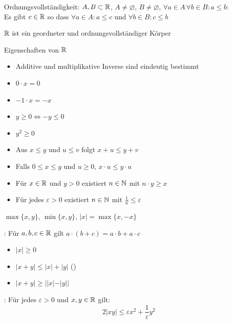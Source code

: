 \Satz Ordnungsvollständigkeit: $A, B \subset \mathbb{R}$, $A\ne \varnothing$, $B\ne \varnothing$,
$\forall a \in A \, \forall b \in B : a\le b$: \\
Es gibt $c \in \mathbb{R}$ so dass $\forall a \in A : a\le c$ und $\forall b \in B : c\le b$

\Satz $\mathbb{R}$ ist ein geordneter und ordnungsvollständiger Körper

\Kor Eigenschaften von $\mathbb{R}$
\vspace{-0.6em}
\begin{itemize}
    \item Additive und multiplikative Inverse sind eindeutig bestimmt
    \item $0 \cdot x = 0$
    \item $-1 \cdot x = -x$
    \item $y\ge 0 \iff -y\le 0$
    \item $y^2\ge 0$
    \item Aus $x\le y$ und $u\le v$ folgt $x + u\le y + v$
    \item Falls $0\le x\le y$ und $u\ge 0$, $x \cdot u\le y \cdot u$
\end{itemize}

\Kor {}
\vspace{-0.6em}
\begin{itemize}
    \item Für $x \in \mathbb{R}$ und $y > 0$ existiert $n \in \mathbb{N}$ mit $n \cdot y\ge x$
    \item Für jedes $\varepsilon > 0$ existiert $n \in \mathbb{N}$ mit $\frac{1}{n}\le \varepsilon$
\end{itemize}

\Def $\max\{x, y\}$, $\min\{x, y\}$,  $|x| = \max\{x, -x\}$

\Satz {}: Für $a, b, c \in \mathbb{R}$ gilt $a \cdot (b + c) = a \cdot b + a \cdot c$

\Satz {}
\vspace{-0.6em}
\begin{itemize}
    \item $|x|\ge 0$
    \item $|x + y|\le |x| + |y|$ ()
    \item $|x + y|\ge ||x| - |y||$
\end{itemize}

\Satz {}: Für jedes $\varepsilon > 0$ und $x, y \in \mathbb{R}$ gilt:
$$2|xy|\le \varepsilon x^2 + \frac{1}{\varepsilon}y^2$$

